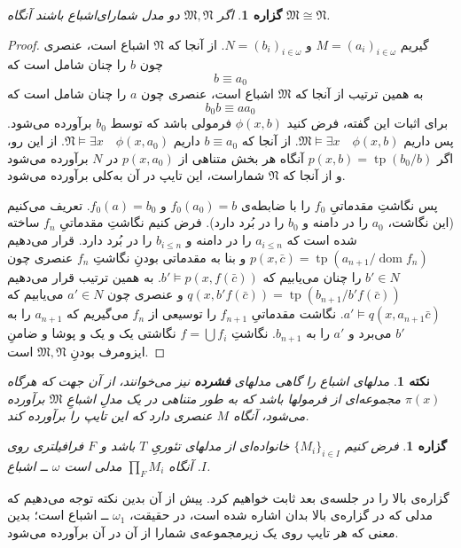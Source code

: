 \documentclass[12pt,a4paper]{report}
\theoremstyle{colorhead}
\newtheorem{prop}[thm]{گزاره}
\newtheorem{nokte}[thm]{نکته}
\DeclareMathOperator{\dom}{dom}
\DeclareMathOperator{\tp}{tp}
\begin{document}
\begin{prop}
اگر
$\mathfrak{M},\mathfrak{N}$
دو مدل شمارای‌اشباع باشند آنگاه
$\mathfrak{M}\cong \mathfrak{N}$.
\end{prop}
\begin{proof}
گیریم
$M=(a_i)_{i\in \omega}$
و
$N=(b_i)_{i\in \omega}$.
از آنجا که
$\mathfrak{N}$
اشباع است، عنصری چون
$b$
را  چنان شامل است که
\[
b\equiv a_0
\]
به همین ترتیب از آنجا که
$\mathfrak{M}$
اشباع است، عنصری چون
$a$
را چنان شامل است که
\[
b_0b\equiv aa_0
\]
برای اثبات این گفته، فرض کنید
$\phi(x,b)$
فرمولی باشد که توسط
$b_0$
برآورده می‌شود. پس داریم
$\mathfrak{M}\models \exists x\quad \phi(x,b)$.
از آنجا که
$b\equiv a_0$
داریم
$\mathfrak{N}\models \exists x\quad \phi(x,a_0)$.
از این رو، اگر 
$p(x,b)=\tp(b_0/b)$
آنگاه هر بخش متناهی از 
$p(x,a_0)$
در
$N$
برآورده می‌شود و از آنجا که
$\mathfrak{N}$
شماراست، این تایپ در آن به‌کلی برآورده می‌شود. 
\par 
پس نگاشتِ
مقدماتیِ
$f_0$
را با ضابطه‌ی
$f_0(a_0)=b$
و
$f_0(a)=b_0$.
تعریف می‌کنیم (این نگاشت،
$a_0$
را در دامنه و 
$b_0$
را در بُرد دارد). فرض کنیم نگاشتِ مقدماتیِ
$f_n$
ساخته شده است که 
$a_{i\leq n}$
را در دامنه و
$b_{i\leq n}$
را در بُرد دارد. 
قرار می‌دهیم
$p(x,\bar{c})=\tp(a_{n+1}/\dom f_n)$
و بنا به مقدماتی بودنِ
نگاشتِ
$f_n$
عنصری چون
$b'\in N$
را
چنان می‌یابیم که
$b'\models p(x,f(\bar{c}))$.
به همین ترتیب 
قرار می‌دهیم
$q(x,b'f(\bar{c}))=\tp(b_{n+1}/b'f(\bar{c}))$
 و 
عنصری چون
$a'\in N$
می‌یابیم که
$a'\models q(x,a_{n+1}\bar{c})$.
نگاشت مقدماتیِ
$f_{n+1}$
را توسیعی از
$f_n$
می‌گیریم که
$a_{n+1}$
را به
$b'$
می‌برد و 
$a'$
را
به
$b_{n+1}$.
نگاشتِ
$f=\bigcup f_i$
نگاشتی یک و یک و پوشا و ضامنِ
ایزومرف بودنِ
$\mathfrak{M},\mathfrak{N}$
است. 
\end{proof}
\begin{nokte}
مدلهای اشباع را گاهی مدلهای
\textbf{ فشرده }
 نیز می‌خوانند، از آن جهت که هرگاه
$\pi(x)$
مجموعه‌ای از فرمولها باشد که به طور متناهی در یک مدلِ اشباعِ
$\mathfrak{M}$
برآورده می‌شود، آنگاه $M$
عنصری دارد که این تایپ را برآورده کند. 
\end{nokte}
\begin{prop}
فرض کنیم 
$\{M_i\}_{i\in I}$
خانواده‌ای از مدلهای تئوریِ
$T$
باشد و 
$F$
فرافیلتری روی
$I$.
آنگاه
$\prod_{F}M_i$
مدلی است
$\omega$
ــ‌
 اشباع. 
\end{prop}
گزاره‌ی بالا را در جلسه‌ی بعد ثابت خواهیم کرد. پیش از آن بدین نکته توجه می‌دهیم که مدلی که در گزاره‌ی بالا بدان اشاره شده است، در حقیقت،
$\omega_1$
ــ 
اشباع است؛ بدین معنی که هر تایپ روی یک زیرمجموعه‌ی شمارا  از آن در آن برآورده می‌شود.
\pagebreak
\end{document}

